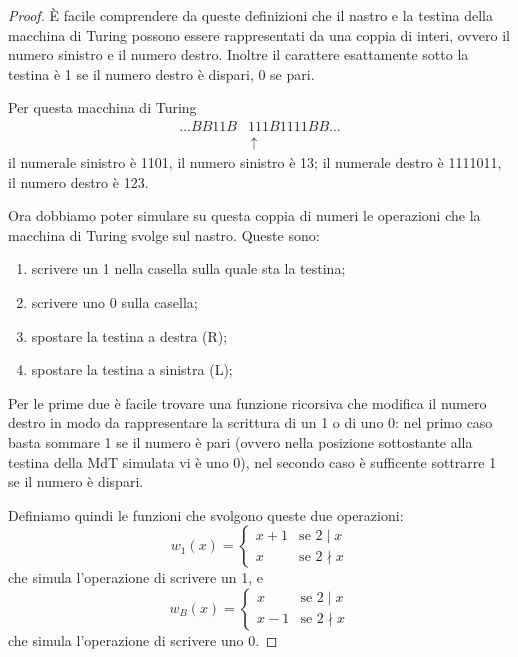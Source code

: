\begin{proof}
È facile comprendere da queste definizioni che il nastro e la testina della
macchina di Turing possono essere rappresentati da una coppia di interi, ovvero
il numero sinistro e il numero destro. Inoltre il carattere esattamente sotto
la testina è 1 se il numero destro è dispari, 0 se pari.

\begin{esempio}
Per questa macchina di Turing
\begin{align*}
\dots BB11B&111B1111BB \dots\\
&\,\uparrow
\end{align*}
il numerale sinistro è 1101, il numero sinistro è 13; il numerale destro è
1111011, il numero destro è 123.
\end{esempio}

Ora dobbiamo poter simulare su questa coppia di numeri le operazioni che la
macchina di Turing svolge sul nastro. Queste sono:
\begin{enumerate}
 \item scrivere un 1 nella casella sulla quale sta la testina;
 \item scrivere uno 0 sulla casella;
 \item spostare la testina a destra (R);
 \item spostare la testina a sinistra (L);
\end{enumerate}

Per le prime due è facile trovare una funzione ricorsiva che modifica il
numero destro in modo da rappresentare la scrittura di un 1 o di uno 0: nel
primo caso basta sommare 1 se il numero è pari (ovvero nella posizione
sottostante alla testina della MdT simulata vi è uno 0), nel secondo caso è
sufficente sottrarre 1 se il numero è dispari.

Definiamo quindi le funzioni che svolgono queste due operazioni:
$$w_1(x) = \left\{
\begin{array}{ll}
x+1 & \text{se } 2 \mid x\\
x & \text{se } 2 \nmid x
\end{array}
\right.$$
che simula l'operazione di scrivere un 1, e
$$w_B(x) = \left\{
\begin{array}{ll}
x & \text{se } 2 \mid x\\
x-1 & \text{se } 2 \nmid x
\end{array}
\right.$$
che simula l'operazione di scrivere uno 0.


\end{proof}
